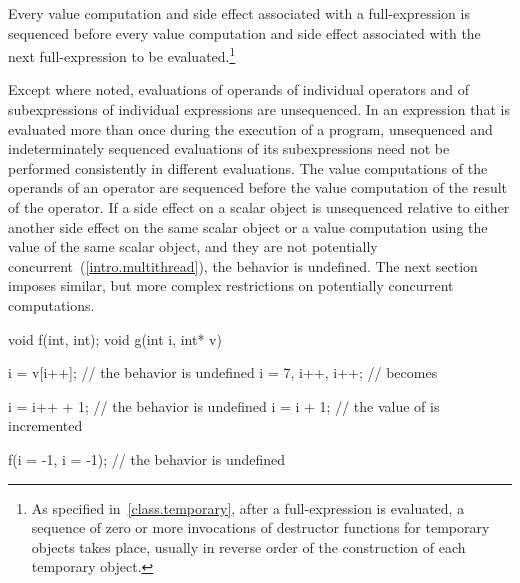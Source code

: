 \pnum
Every
%
value computation and
%
side effect associated with a full-expression is
sequenced before every value computation and side effect associated with the
next full-expression to be evaluated.\footnote{As specified
in~\ref{class.temporary}, after a full-expression is evaluated, a sequence of
zero or more invocations of destructor functions for temporary objects takes
place, usually in reverse order of the construction of each temporary object.}

\pnum
{}%
Except where noted, evaluations of operands of individual operators and
of subexpressions of individual expressions are unsequenced. \enternote
In an expression that is evaluated more than once during the execution
of a program, unsequenced and indeterminately sequenced evaluations of
its subexpressions need not be performed consistently in different
evaluations. \exitnote The value computations of the operands of an
operator are sequenced before the value computation of the result of the
operator. If a
%
side effect on a scalar object is unsequenced relative to
either another side effect on the same scalar object or a value
computation using the value of the same scalar object,
and they are not potentially concurrent~(\ref{intro.multithread}),
the behavior is undefined.
\enternote
The next section imposes similar, but more complex restrictions on
potentially concurrent computations.
\exitnote

\enterexample

\begin{codeblock}
void f(int, int);
void g(int i, int* v) {
  i = v[i++];         // the behavior is undefined
  i = 7, i++, i++;    //  becomes 

  i = i++ + 1;        // the behavior is undefined
  i = i + 1;          // the value of  is incremented

  f(i = -1, i = -1);  // the behavior is undefined
}
\end{codeblock}
\exitexample

